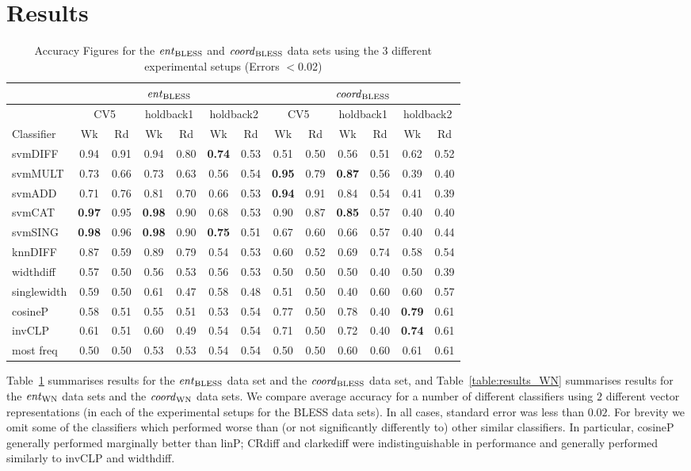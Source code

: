 \documentclass[11pt]{article}
\newcommand\entBLESS{\mbox{\em ent\/}_{\mbox{\scriptsize BLESS}}}
\newcommand\coordBLESS{\mbox{\em coord\/}_{\mbox{\scriptsize BLESS}}}
\newcommand\entWN{\mbox{\em ent\/}_{\mbox{\scriptsize WN}}}
\newcommand\coordWN{\mbox{\em coord\/}_{\mbox{\scriptsize WN}}}
\begin{document}
\section{Results}
\label{sect:results}

\begin{table*}[ht]
\centering
\begin{tabular}{|l|c|c|c|c|c|c||c|c|c|c|c|c|}
\hline
&\multicolumn{6}{|c||}{$\entBLESS$}&\multicolumn{6}{|c|}{$\coordBLESS$}\\
\hline
&\multicolumn{2}{|c|}{CV5}&\multicolumn{2}{|c|}{holdback1}&\multicolumn{2}{|c||}{holdback2}&\multicolumn{2}{|c|}{CV5}&\multicolumn{2}{|c|}{holdback1}&\multicolumn{2}{|c|}{holdback2}\\
\hline
Classifier&Wk&Rd&Wk&Rd&Wk&Rd&Wk&Rd&Wk&Rd&Wk&Rd\\
\hline
svmDIFF&0.94&0.91&0.94&0.80&\textbf{0.74}&0.53&0.51&0.50&0.56&0.51&0.62&0.52\\
svmMULT&0.73&0.66&0.73&0.63&0.56&0.54&\textbf{0.95}&0.79&\textbf{0.87}&0.56&0.39&0.40\\
svmADD&0.71&0.76&0.81&0.70&0.66&0.53&\textbf{0.94}&0.91&0.84&0.54&0.41&0.39\\
svmCAT&\textbf{0.97}&0.95&\textbf{0.98}&0.90&0.68&0.53&0.90&0.87&\textbf{0.85}&0.57&0.40&0.40\\
svmSING&\textbf{0.98}&0.96&\textbf{0.98}&0.90&\textbf{0.75}&0.51&0.67&0.60&0.66&0.57&0.40&0.44\\
knnDIFF&0.87&0.59&0.89&0.79&0.54&0.53&0.60&0.52&0.69&0.74&0.58&0.54\\
\hline
widthdiff&0.57&0.50&0.56&0.53&0.56&0.53&0.50&0.50&0.50&0.40&0.50&0.39\\
singlewidth&0.59&0.50&0.61&0.47&0.58&0.48&0.51&0.50&0.40&0.60&0.60&0.57\\
cosineP&0.58&0.51&0.55&0.51&0.53&0.54&0.77&0.50&0.78&0.40&\textbf{0.79}&0.61\\
invCLP&0.61&0.51&0.60&0.49&0.54&0.54&0.71&0.50&0.72&0.40&\textbf{0.74}&0.61\\
most freq&0.50&0.50&0.53&0.53&0.54&0.54&0.50&0.50&0.60&0.60&0.61&0.61\\
\hline
\end{tabular}
\caption{Accuracy Figures for the \emph{$\entBLESS$} and \emph{$\coordBLESS$} data sets using the 3 different experimental setups (Errors $< $0.02)}
\label{table:results_ent}
\end{table*}

Table~\ref{table:results_ent} summarises results for the $\entBLESS$ data set and the $\coordBLESS$ data set, and Table~\ref{table:results_WN} summarises results for the $\entWN$ data sets and the $\coordWN$ data sets.  We compare average accuracy for a number of different classifiers using $2$ different vector representations (in each of the experimental setups for the BLESS data sets).  In all cases, standard error was less than $0.02$.  For brevity we omit some of the classifiers which performed worse than (or not significantly differently to) other similar classifiers.  In particular, cosineP generally performed marginally better than linP; CRdiff and clarkediff were indistinguishable in performance and generally performed similarly to invCLP and widthdiff.
\end{document}
